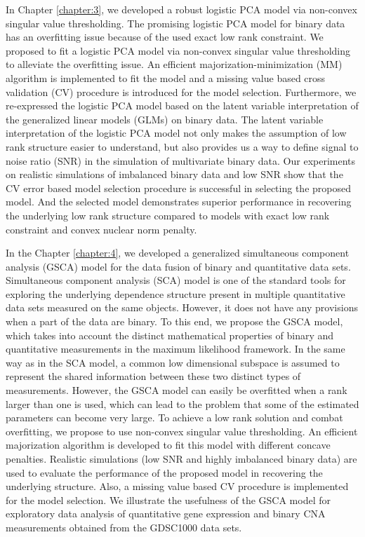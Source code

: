 In Chapter \ref{chapter:3}, we developed a robust logistic PCA model via non-convex singular value thresholding. The promising logistic PCA model for binary data has an overfitting issue because of the used exact low rank constraint. We proposed to fit a logistic PCA model via non-convex singular value thresholding to alleviate the overfitting issue. An efficient majorization-minimization (MM) algorithm is implemented to fit the model and a missing value based cross validation (CV) procedure is introduced for the model selection. Furthermore, we re-expressed the logistic PCA model based on the latent variable interpretation of the generalized linear models (GLMs) on binary data. The latent variable interpretation of the logistic PCA model not only makes the assumption of low rank structure easier to understand, but also provides us a way to define signal to noise ratio (SNR) in the simulation of multivariate binary data. Our experiments on realistic simulations of imbalanced binary data and low SNR show that the CV error based model selection procedure is successful in selecting the proposed model. And the selected model demonstrates superior performance in recovering the underlying low rank structure compared to models with exact low rank constraint and convex nuclear norm penalty.

In the Chapter \ref{chapter:4}, we developed a generalized simultaneous component analysis (GSCA) model for the data fusion of binary and quantitative data sets. Simultaneous component analysis (SCA) model is one of the standard tools for exploring the underlying dependence structure present in multiple quantitative data sets measured on the same objects. However, it does not have any provisions when a part of the data are binary. To this end, we propose the GSCA model, which takes into account the distinct mathematical properties of binary and quantitative measurements in the maximum likelihood framework. In the same way as in the SCA model, a common low dimensional subspace is assumed to represent the shared information between these two distinct types of measurements. However, the GSCA model can easily be overfitted when a rank larger than one is used, which can lead to the problem that some of the estimated parameters can become very large. To achieve a low rank solution and combat overfitting, we propose to use non-convex singular value thresholding. An efficient majorization algorithm is developed to fit this model with different concave penalties. Realistic simulations (low SNR and highly imbalanced binary data) are used to evaluate the performance of the proposed model in recovering the underlying structure. Also, a missing value based CV procedure is implemented for the model selection. We illustrate the usefulness of the GSCA model for exploratory data analysis of quantitative gene expression and binary CNA measurements obtained from the GDSC1000 data sets.

